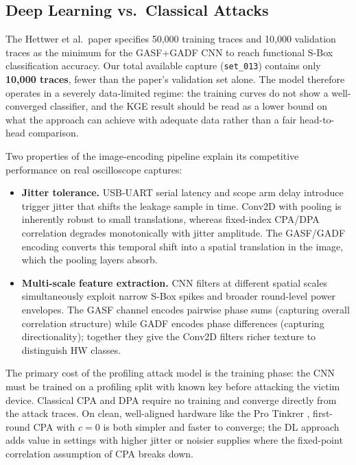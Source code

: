 \subsection{Deep Learning vs.\ Classical Attacks}
\label{sec:discussion:dl}

The Hettwer et al.\ paper specifies 50{,}000 training traces and 10{,}000
validation traces as the minimum for the GASF+GADF CNN to reach functional
S-Box classification accuracy.
Our total available capture (\texttt{set\_013}) contains only
\textbf{10{,}000 traces}, fewer than the paper's validation set alone.
The model therefore operates in a severely data-limited regime: the training
curves do not show a well-converged classifier, and the KGE result should
be read as a lower bound on what the approach can achieve with adequate
data rather than a fair head-to-head comparison.

Two properties of the image-encoding pipeline explain its competitive
performance on real oscilloscope captures:

\begin{itemize}
  \item \textbf{Jitter tolerance.}
    USB-UART serial latency and scope arm delay introduce trigger jitter
    that shifts the leakage sample in time.
    Conv2D with pooling is inherently robust to small translations, whereas
    fixed-index CPA/DPA correlation degrades monotonically with jitter
    amplitude.
    The GASF/GADF encoding converts this temporal shift into a spatial
    translation in the image, which the pooling layers absorb.

  \item \textbf{Multi-scale feature extraction.}
    CNN filters at different spatial scales simultaneously exploit narrow
    S-Box spikes and broader round-level power envelopes.
    The GASF channel encodes pairwise phase sums (capturing overall
    correlation structure) while GADF encodes phase differences
    (capturing directionality); together they give the Conv2D filters
    richer texture to distinguish HW classes.
\end{itemize}

The primary cost of the profiling attack model is the training phase: the
CNN must be trained on a profiling split with known key before attacking
the victim device.
Classical CPA and DPA require no training and converge directly from the
attack traces.
On clean, well-aligned hardware like the Pro Tinkrer , first-round CPA
with $c=0$ is both simpler and faster to converge; the DL approach adds
value in settings with higher jitter or noisier supplies where the
fixed-point correlation assumption of CPA breaks down.

